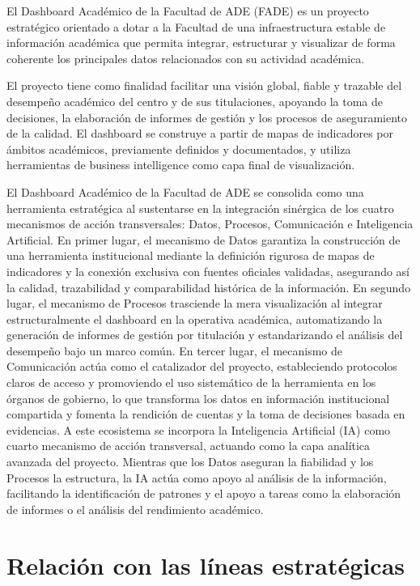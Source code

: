 \documentclass[11pt,a4paper]{scrreprt}
\begin{document}
\small
El Dashboard Académico de la Facultad de ADE (FADE) es un proyecto estratégico orientado a dotar a la Facultad de una infraestructura estable de información académica que permita integrar, estructurar y visualizar de forma coherente los principales datos relacionados con su actividad académica.

El proyecto tiene como finalidad facilitar una visión global, fiable y trazable del desempeño académico del centro y de sus titulaciones, apoyando la toma de decisiones, la elaboración de informes de gestión y los procesos de aseguramiento de la calidad. El dashboard se construye a partir de mapas de indicadores por ámbitos académicos, previamente definidos y documentados, y utiliza herramientas de business intelligence como capa final de visualización.

El Dashboard Académico de la Facultad de ADE se consolida como una herramienta estratégica al sustentarse en la integración sinérgica de los cuatro mecanismos de acción transversales: Datos, Procesos, Comunicación e Inteligencia Artificial. En primer lugar, el mecanismo de Datos garantiza la construcción de una herramienta institucional mediante la definición rigurosa de mapas de indicadores y la conexión exclusiva con fuentes oficiales validadas, asegurando así la calidad, trazabilidad y comparabilidad histórica de la información. En segundo lugar, el mecanismo de Procesos trasciende la mera visualización al integrar estructuralmente el dashboard en la operativa académica, automatizando la generación de informes de gestión por titulación y estandarizando el análisis del desempeño bajo un marco común. En tercer lugar, el mecanismo de Comunicación actúa como el catalizador del proyecto, estableciendo protocolos claros de acceso y promoviendo el uso sistemático de la herramienta en los órganos de gobierno, lo que transforma los datos en información institucional compartida y fomenta la rendición de cuentas y la toma de decisiones basada en evidencias. A este ecosistema se incorpora la Inteligencia Artificial (IA) como cuarto mecanismo de acción transversal, actuando como la capa analítica avanzada del proyecto. Mientras que los Datos aseguran la fiabilidad y los Procesos la estructura, la IA actúa como apoyo al análisis de la información, facilitando la identificación de patrones y el apoyo a tareas como la elaboración de informes o el análisis del rendimiento académico.

\section{Relación con las líneas estratégicas}
\end{document}
